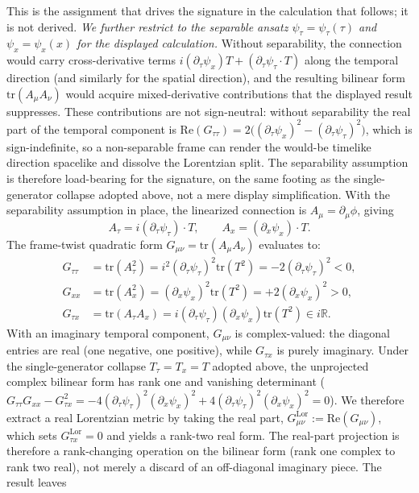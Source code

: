 \documentclass[11pt]{article}
\begin{document}
This is the assignment that drives the signature in the calculation that follows; it is not derived. \emph{We further restrict to the separable ansatz $\psi_\tau = \psi_\tau(\tau)$ and $\psi_x = \psi_x(x)$ for the displayed calculation.} Without separability, the connection would carry cross-derivative terms $i(\partial_\tau \psi_x)T + (\partial_\tau \psi_\tau \cdot T)$ along the temporal direction (and similarly for the spatial direction), and the resulting bilinear form $\mathrm{tr}(A_\mu A_\nu)$ would acquire mixed-derivative contributions that the displayed result suppresses. These contributions are not sign-neutral: without separability the real part of the temporal component is $\mathrm{Re}(G_{\tau\tau}) = 2\big((\partial_\tau \psi_x)^2 - (\partial_\tau \psi_\tau)^2\big)$, which is sign-indefinite, so a non-separable frame can render the would-be timelike direction spacelike and dissolve the Lorentzian split. The separability assumption is therefore load-bearing for the signature, on the same footing as the single-generator collapse adopted above, not a mere display simplification. With the separability assumption in place, the linearized connection is $A_\mu = \partial_\mu \phi$, giving
\begin{equation}
A_\tau = i(\partial_\tau \psi_\tau) \cdot T, \qquad A_x = (\partial_x \psi_x) \cdot T.
\end{equation}
The frame-twist quadratic form $G_{\mu\nu} = \mathrm{tr}(A_\mu A_\nu)$ evaluates to:
\begin{align}
G_{\tau\tau} &= \mathrm{tr}(A_\tau^2) = i^2 (\partial_\tau \psi_\tau)^2 \mathrm{tr}(T^2) = -2(\partial_\tau \psi_\tau)^2 < 0, \\
G_{xx} &= \mathrm{tr}(A_x^2) = (\partial_x \psi_x)^2 \mathrm{tr}(T^2) = +2(\partial_x \psi_x)^2 > 0, \\
G_{\tau x} &= \mathrm{tr}(A_\tau A_x) = i(\partial_\tau \psi_\tau)(\partial_x \psi_x)\mathrm{tr}(T^2) \in i\mathbb{R}.
\end{align}
With an imaginary temporal component, $G_{\mu\nu}$ is complex-valued: the diagonal entries are real (one negative, one positive), while $G_{\tau x}$ is purely imaginary. Under the single-generator collapse $T_\tau = T_x = T$ adopted above, the unprojected complex bilinear form has rank one and vanishing determinant ($G_{\tau\tau} G_{xx} - G_{\tau x}^2 = -4(\partial_\tau\psi_\tau)^2(\partial_x\psi_x)^2 + 4(\partial_\tau\psi_\tau)^2(\partial_x\psi_x)^2 = 0$). We therefore extract a real Lorentzian metric by taking the real part, $G^{\mathrm{Lor}}_{\mu\nu} := \mathrm{Re}(G_{\mu\nu})$, which sets $G^{\mathrm{Lor}}_{\tau x} = 0$ and yields a rank-two real form. The real-part projection is therefore a rank-changing operation on the bilinear form (rank one complex to rank two real), not merely a discard of an off-diagonal imaginary piece. The result leaves
\end{document}

